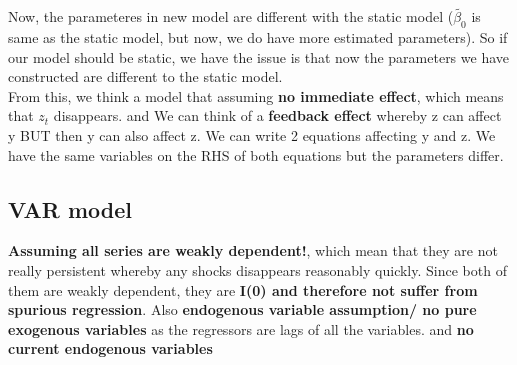 \documentclass[12pt]{article}
\begin{document}
Now, the parameteres in new model are different with the static model ($\tilde{\beta _0}$ is same as the static model, but now, we do have more estimated parameters). So if our model should be static, we have the issue is that now the parameters we have constructed are different to the static model. 
\\

From this, we think a model that assuming \textbf{no immediate effect}, which means that $z_t$ disappears. and We can think of a \textbf{feedback effect} whereby z can affect y BUT then y can also affect z. We can write 2 equations affecting y and z. We have the same variables on the RHS of both equations but the parameters differ. 
\\


{\color{RoyalBlue}
\subsection{VAR model}}
\textbf{Assuming all series are weakly dependent!}, which mean that they are not really persistent whereby any shocks disappears reasonably quickly. Since both of them are weakly dependent, they are \textbf{I(0) and therefore not suffer from spurious regression}.  Also \textbf{endogenous variable assumption/ no pure exogenous variables} as the regressors are lags of all the variables. and \textbf{no current endogenous variables} 
\\
\end{document}
